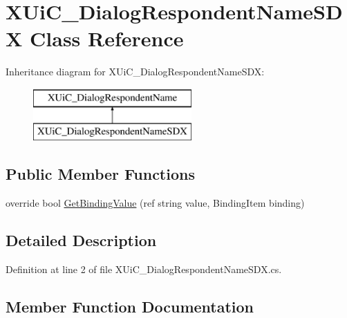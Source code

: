 \hypertarget{class_x_ui_c___dialog_respondent_name_s_d_x}{}\section{X\+Ui\+C\+\_\+\+Dialog\+Respondent\+Name\+S\+DX Class Reference}
\label{class_x_ui_c___dialog_respondent_name_s_d_x}
Inheritance diagram for X\+Ui\+C\+\_\+\+Dialog\+Respondent\+Name\+S\+DX\+:\begin{figure}[H]
\begin{center}
\leavevmode
\includegraphics[height=2.000000cm]{class_x_ui_c___dialog_respondent_name_s_d_x}
\end{center}
\end{figure}
\subsection*{Public Member Functions}
\begin{DoxyCompactItemize}
\item 
override bool \mbox{\hyperlink{class_x_ui_c___dialog_respondent_name_s_d_x_a59d072ca9b0063afc9cbbe1f8dc748e8}{Get\+Binding\+Value}} (ref string value, Binding\+Item binding)
\end{DoxyCompactItemize}


\subsection{Detailed Description}


Definition at line 2 of file X\+Ui\+C\+\_\+\+Dialog\+Respondent\+Name\+S\+D\+X.\+cs.



\subsection{Member Function Documentation}
\mbox{\label{class_x_ui_c___dialog_respondent_name_s_d_x_a59d072ca9b0063afc9cbbe1f8dc748e8}} 

